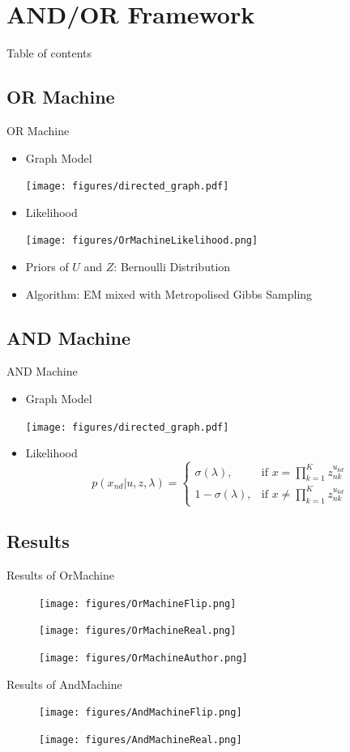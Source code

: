 \documentclass[handout]{beamer}
\begin{document}
\section[Framework]{AND/OR Framework}
\begin{frame}{Table of contents}
\begin{multicols}{2}
\end{multicols}
\end{frame}

\subsection[OR]{OR Machine}
\begin{frame}{OR Machine}
\begin{itemize}
\item{Graph Model}

\texttt{[image: figures/directed\_graph.pdf]}
\item{Likelihood}

\texttt{[image: figures/OrMachineLikelihood.png]}
\item{Priors of $U$ and $Z$: Bernoulli Distribution}
\item{Algorithm: EM mixed with Metropolised Gibbs Sampling}

\end{itemize}
\end{frame}

\subsection[AND]{AND Machine}
\begin{frame}{AND Machine}
\begin{itemize}
\item{Graph Model}

\texttt{[image: figures/directed\_graph.pdf]}
\item{Likelihood}
\[
    p(x_{nd}|u,z,\lambda) = 
    \begin{cases}
        \sigma(\lambda), & \text{if } x=\prod\limits_{k=1}^{K}z_{nk}^{u_{kd}}\\
        1-\sigma(\lambda), & \text{if } x\neq\prod\limits_{k=1}^{K}z_{nk}^{u_{kd}}
    \end{cases}
\]
\end{itemize}
\end{frame}

\subsection[Results]{Results}
\begin{frame}{Results of OrMachine}
\begin{figure}[H]
\texttt{[image: figures/OrMachineFlip.png]}

\texttt{[image: figures/OrMachineReal.png]}

\texttt{[image: figures/OrMachineAuthor.png]}
\end{figure}
\end{frame}

\begin{frame}{Results of AndMachine}
\begin{figure}[H]
\texttt{[image: figures/AndMachineFlip.png]}

\texttt{[image: figures/AndMachineReal.png]}

\end{figure}
\end{frame}
\end{document}
